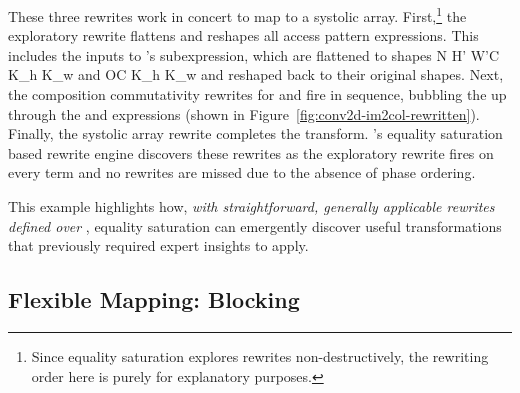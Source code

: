 These three rewrites work in concert 
  to map \ctd
  to a systolic array.
First,\footnote{
Since equality saturation 
  explores rewrites non-destructively, 
  the rewriting order here
  is purely for explanatory purposes.
}
  the exploratory rewrite
  flattens and reshapes
  all access pattern expressions.
This includes the inputs
  to \ctd's 
  subexpression,
  which are flattened
  to shapes
  \accesspatternshape
  {N  \cdot H' \cdot W'}{C \cdot K_h \cdot K_w}
  and
  \accesspatternshape
  {O}{C \cdot K_h \cdot K_w}
  and reshaped
  back to their original shapes.
Next,
  the composition commutativity rewrites
  for  
  and
  fire in sequence,
  bubbling the  up
  through the 
  and  
  expressions (shown in Figure~\ref{fig:conv2d-im2col-rewritten}).
Finally,
  the systolic array rewrite
  completes the  transform.
\g's equality saturation based rewrite engine
  discovers these rewrites
  as the exploratory rewrite 
  fires on every term
  and no rewrites are missed
  due to the absence of phase ordering.

This example highlights how,
  \textit{with straightforward,
  generally applicable rewrites
  defined over \g},
  equality saturation
  can emergently discover useful transformations
  that previously required
  expert insights to apply.

\subsection{Flexible Mapping:  Blocking}
\label{sec:case-study-blocking}


%

